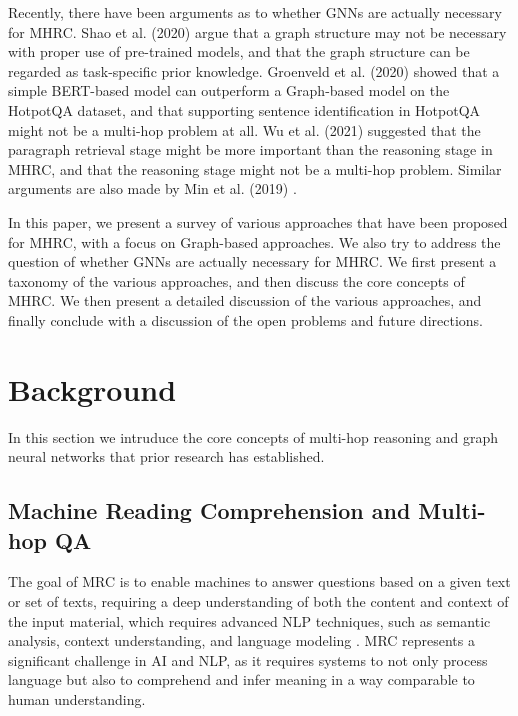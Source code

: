 \documentclass[sigplan,screen]{acmart}
\begin{document}
Recently, there have been arguments as to whether GNNs are actually necessary for MHRC. Shao et al. (2020) \cite{RN127} argue that 
a graph structure may not be necessary with proper use of pre-trained models, and that the graph structure can be regarded as task-specific 
prior knowledge. Groenveld et al. (2020) \cite{RN126} showed that a simple BERT-based model can outperform a Graph-based model on the HotpotQA 
dataset, and that supporting sentence identification in HotpotQA might not be a multi-hop problem at all. Wu et al. (2021) \cite{RN106} 
suggested that the paragraph retrieval stage might be more important than the reasoning stage in MHRC, and that the reasoning stage might not 
be a multi-hop problem. Similar arguments are also made by Min et al. (2019) \cite{RN150}.

In this paper, we present a survey of various approaches that have been proposed for MHRC, with a focus on Graph-based approaches. We also 
try to address the question of whether GNNs are actually necessary for MHRC. We first present a taxonomy of the various approaches, and then 
discuss the core concepts of MHRC. We then present a detailed discussion of the various approaches, and finally conclude with a discussion of 
the open problems and future directions.

\section{Background}
In this section we intruduce the core concepts of multi-hop reasoning and graph neural networks that prior research has established.  

\subsection{Machine Reading Comprehension and Multi-hop QA}
The goal of MRC is to enable machines to answer questions based on a given text or set of texts, requiring a deep understanding of both the content and context of the input material, which 
requires advanced NLP techniques, such as semantic analysis, context understanding, and language modeling \cite{RN208}. MRC represents a significant challenge in AI and NLP, as it requires systems to not only process language but also to comprehend and infer meaning in a way comparable to human understanding.
\end{document}
